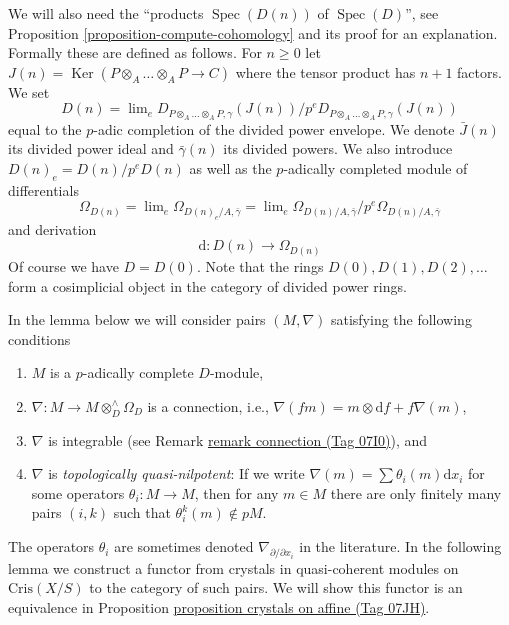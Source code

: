 \documentclass{amsart}
\theoremstyle{plain}
\theoremstyle{definition}
\theoremstyle{remark}
\numberwithin{equation}{subsection}
\def\lim{\mathop{\mathrm{lim}}\nolimits}
\def\Spec{\mathop{\mathrm{Spec}}}
\def\Ker{\mathop{\mathrm{Ker}}}
\begin{document}
\medskip\noindent
We will also need the ``products $\Spec(D(n))$ of $\Spec(D)$'', see
Proposition \ref{proposition-compute-cohomology} and its proof for an
explanation. Formally these are defined as follows. For $n \geq 0$ let
$J(n) = \Ker(P \otimes_A \ldots \otimes_A P \to C)$ where
the tensor product has $n + 1$ factors. We set
\begin{equation}
\label{equation-Dn}
D(n) = \lim_e
D_{P \otimes_A \ldots \otimes_A P, \gamma}(J(n))/
p^eD_{P \otimes_A \ldots \otimes_A P, \gamma}(J(n))
\end{equation}
equal to the $p$-adic completion of the divided power envelope.
We denote $\bar J(n)$ its divided power ideal and $\bar \gamma(n)$
its divided powers. We also introduce $D(n)_e = D(n)/p^eD(n)$ as well
as the $p$-adically completed module of differentials
\begin{equation}
\label{equation-omega-Dn}
\Omega_{D(n)} = \lim_e \Omega_{D(n)_e/A, \bar\gamma} =
\lim_e \Omega_{D(n)/A, \bar\gamma}/p^e\Omega_{D(n)/A, \bar\gamma}
\end{equation}
and derivation
\begin{equation}
\label{equation-derivation-Dn}
\text{d} : D(n) \longrightarrow \Omega_{D(n)}
\end{equation}
Of course we have $D = D(0)$. Note that the rings $D(0), D(1), D(2), \ldots$
form a cosimplicial object in the category of divided power rings.



\noindent
In the lemma below we will consider pairs $(M, \nabla)$ satisfying the
following conditions
\begin{enumerate}
\item
\label{item-complete}
$M$ is a $p$-adically complete $D$-module,
\item
\label{item-connection}
$\nabla : M \to M \otimes^\wedge_D \Omega_D$ is a connection, i.e.,
$\nabla(fm) = m \otimes \text{d}f + f\nabla(m)$,
\item
\label{item-integrable}
$\nabla$ is integrable
(see Remark \href{https://stacks.math.columbia.edu/tag/07I0}{remark connection (Tag 07I0)}), and
\item
\label{item-topologically-quasi-nilpotent}
$\nabla$ is {\it topologically quasi-nilpotent}: If we write
$\nabla(m) = \sum \theta_i(m)\text{d}x_i$ for some operators
$\theta_i : M \to M$, then for any $m \in M$ there are only finitely
many pairs $(i, k)$ such that $\theta_i^k(m) \not \in pM$.
\end{enumerate}
The operators $\theta_i$ are sometimes denoted
$\nabla_{\partial/\partial x_i}$ in the literature.
In the following lemma we construct a functor from crystals in quasi-coherent
modules on $\text{Cris}(X/S)$ to the category of such pairs. We will show
this functor is an equivalence in
Proposition \href{https://stacks.math.columbia.edu/tag/07JH}{proposition crystals on affine (Tag 07JH)}.
\end{document}
